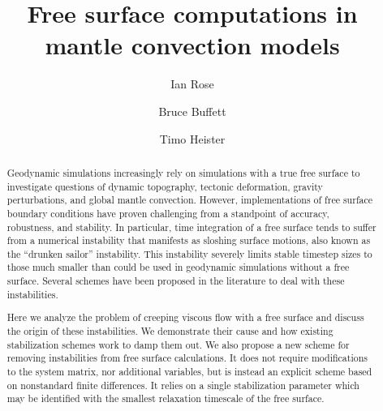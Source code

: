 \documentclass[preprint,12pt,authoryear]{elsarticle}
\begin{document}
\begin{frontmatter}



\title{Free surface computations in mantle convection models}


\author{Ian Rose}
\author{Bruce Buffett}
\author{Timo Heister}



\address{}

\begin{abstract}
Geodynamic simulations increasingly rely on simulations with a true free surface to 
investigate questions of dynamic topography, tectonic deformation, gravity perturbations, and
global mantle convection. However, implementations of free surface boundary conditions 
have proven challenging from a standpoint of accuracy, robustness, and stability.
In particular, time integration of a free surface tends to suffer from a numerical instability
that manifests as sloshing surface motions, also known as the ``drunken sailor'' instability.
This instability severely limits stable timestep sizes to those much smaller than could be used
in geodynamic simulations without a free surface. 
Several schemes have been proposed in the literature to deal with these instabilities.

Here we analyze the problem of creeping viscous flow with a free surface and discuss the 
origin of these instabilities. We demonstrate their cause and how existing stabilization 
schemes work to damp them out.
We also propose a new scheme for removing instabilities from free surface calculations. 
It does not require modifications to the system matrix, nor additional variables, but is instead
an explicit scheme based on nonstandard finite differences.  It relies on a single 
stabilization parameter which may be identified with the smallest relaxation timescale of the
free surface.


\end{abstract}
\end{frontmatter}
\end{document}
